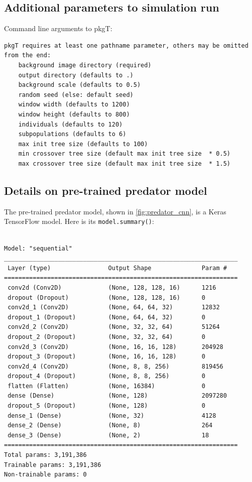 \documentclass[acmtog]{acmart}
\begin{document}
\subsection{Additional parameters to simulation run}
Command line arguments to pkgT:
\begin{adjustwidth}{1cm}{0cm}
\begin{small}
\begin{verbatim}
pkgT requires at least one pathname parameter, others may be omitted from the end:
    background image directory (required)
    output directory (defaults to .)
    background scale (defaults to 0.5)
    random seed (else: default seed)
    window width (defaults to 1200)
    window height (defaults to 800)
    individuals (defaults to 120)
    subpopulations (defaults to 6)
    max init tree size (defaults to 100)
    min crossover tree size (default max init tree size  * 0.5)
    max crossover tree size (default max init tree size  * 1.5)
\end{verbatim}
\end{small}
\end{adjustwidth}

\subsection{Details on pre-trained predator model}
The pre-trained predator model, shown in \ref{fig:predator_cnn}, is a Keras TensorFlow model. Here is its \texttt{model.summary()}:
\begin{adjustwidth}{1cm}{0cm}
\begin{small}
\begin{verbatim}

Model: "sequential"
_________________________________________________________________
 Layer (type)                Output Shape              Param #
=================================================================
 conv2d (Conv2D)             (None, 128, 128, 16)      1216
 dropout (Dropout)           (None, 128, 128, 16)      0
 conv2d_1 (Conv2D)           (None, 64, 64, 32)        12832
 dropout_1 (Dropout)         (None, 64, 64, 32)        0
 conv2d_2 (Conv2D)           (None, 32, 32, 64)        51264
 dropout_2 (Dropout)         (None, 32, 32, 64)        0
 conv2d_3 (Conv2D)           (None, 16, 16, 128)       204928
 dropout_3 (Dropout)         (None, 16, 16, 128)       0
 conv2d_4 (Conv2D)           (None, 8, 8, 256)         819456
 dropout_4 (Dropout)         (None, 8, 8, 256)         0
 flatten (Flatten)           (None, 16384)             0
 dense (Dense)               (None, 128)               2097280
 dropout_5 (Dropout)         (None, 128)               0
 dense_1 (Dense)             (None, 32)                4128
 dense_2 (Dense)             (None, 8)                 264
 dense_3 (Dense)             (None, 2)                 18
=================================================================
Total params: 3,191,386
Trainable params: 3,191,386
Non-trainable params: 0
\end{verbatim}
\end{small}
\end{adjustwidth}

\end{document}
